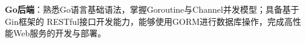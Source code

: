 \item \textbf{Go后端}：熟悉Go语言基础语法，掌握Goroutine与Channel并发模型；具备基于Gin框架的 RESTful接口开发能力，能够使用GORM进行数据库操作，完成高性能Web服务的开发与部署。